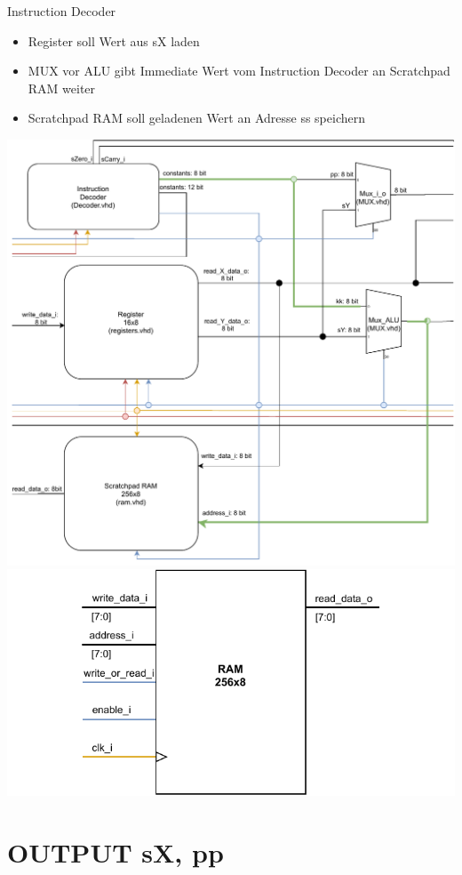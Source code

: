 \documentclass[10pt, t,
aspectratio=169,%
usenames,
dvipsnames,
]{beamer}
\begin{document}
	\begin{frame}{Instruction Decoder}	
		\begin{itemize}
			\item Register soll Wert aus sX laden
			\item MUX vor ALU gibt Immediate Wert vom Instruction Decoder an Scratchpad RAM weiter
			\item Scratchpad RAM soll geladenen Wert an Adresse ss speichern
		\end{itemize}
		\begin{multicols}{2}	
		\includegraphics[width=.7\linewidth]{../Blockbeschreibungen/RAM-BlockdiagramSnipits2.pdf}
		\includegraphics[width=\linewidth]{../Blockbeschreibungen/RAM_beschreibung.pdf}
		\end{multicols}
	\end{frame}

	\section{OUTPUT sX, pp}
	
\end{document}
